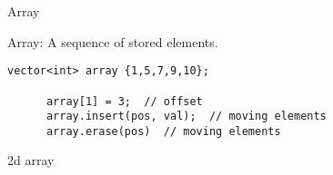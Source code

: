 \begin{frame}{}
  \centerline{\Large Array}
\end{frame}

\begin{frame}[fragile]{}
  \centerline{Array: A sequence of  stored elements.}


  \pause
  \begin{lstlisting}[style = CStyle]
      vector<int> array {1,5,7,9,10};

      array[1] = 3;  // offset
      array.insert(pos, val);  // moving elements
      array.erase(pos)  // moving elements
  \end{lstlisting}
\end{frame}

\begin{frame}{}
  2d array
\end{frame}
